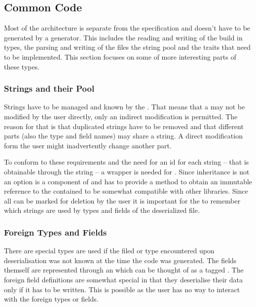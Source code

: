 \documentclass[thesis]{subfiles}
\begin{document}
  \subsection{Common Code}
    Most of the architecture is separate from the specification and doesn't have to be generated by a generator.
    This includes the reading and writing of the build in types, the parsing and writing of the files the string pool and the traits that need to be implemented.
    This section focuses on some of more interesting parts of these types.

    \subsubsection{Strings and their Pool}
      Strings have to be managed and known by the \StringPool.
      That means that a \String may not be modified by the user directly, only an indirect modification is permitted.
      The reason for that is that duplicated strings have to be removed and that different parts (also the type and field names) may share a string.
      A direct modification form the user might inadvertently change another part.

      To conform to these requirements and the need for an id for each string -- that is obtainable through the string -- a wrapper is needed for \String.
      Since inheritance is not an option \String is a component of \SkillString and \SkillString has to provide a method to obtain an immutable reference to the contained \String to be somewhat compatible with other libraries.
      Since all \SkillStrings can be marked for deletion by the user it is important for the \StringPool to remember which strings are used by types and fields of the deserialized file.

    \subsubsection{Foreign Types and Fields}
      There are special types are used if the filed or type encountered upon deserialisation was not known at the time the code was generated.
      The fields themself are represented through an \enum which can be thought of as a tagged .
      The foreign field definitions are somewhat special in that they deserialise their data only if it has to be written.
      This is possible as the user has no way to interact with the foreign types or fields.
\end{document}
